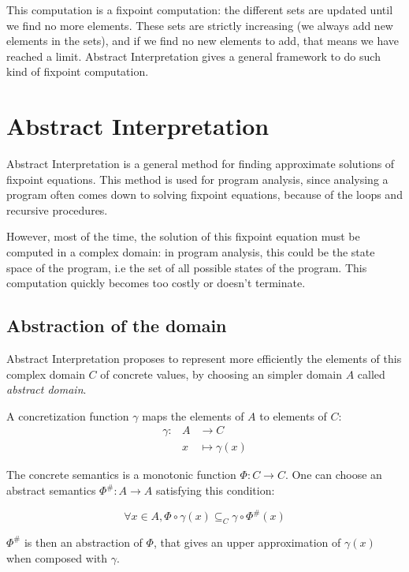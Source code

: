 \documentclass[a4paper,english,titlepage,11pt]{report}
\begin{document}
This computation is a fixpoint computation: the different sets are updated until
we find no more elements. These sets are strictly increasing (we always add new
elements in the sets), and if we find no new elements to add, that means we have
reached a limit. Abstract Interpretation gives a general framework to do such
kind of fixpoint computation.


\section{Abstract Interpretation}

Abstract Interpretation \cite{CC77,CousotCousot92-1} is a general method for
finding approximate solutions of
fixpoint equations. This method is used for program analysis, since analysing a
program often comes down to solving fixpoint equations, because of the loops and
recursive procedures.

However, most of the time, the solution of this fixpoint equation must be
computed in a complex domain: in program analysis, this could be the state space
of the program, i.e the set of all possible states of the program. This
computation quickly becomes too costly or doesn't terminate.

\subsection{Abstraction of the domain}

Abstract Interpretation proposes to represent more efficiently the
elements of this complex domain $C$ of concrete values,
by choosing an simpler domain  $A$ called \emph{abstract domain}. 

A concretization function $\gamma$ maps the elements of $A$ to elements of $C$:
\begin{eqnarray*}
\gamma: & A &\longrightarrow C \\
		& x &\longmapsto \gamma(x)
\end{eqnarray*}

The concrete semantics is a monotonic function $\Phi: C \rightarrow C$.
One can choose an abstract semantics $\Phi^\#: A \rightarrow A$ satisfying this
condition:

$$\forall x \in A, \Phi \circ \gamma (x) \subseteq_C \gamma \circ \Phi^\#(x)$$

$\Phi^\#$ is then an abstraction of $\Phi$, that gives an upper
approximation of $\gamma(x)$ when composed with $\gamma$. 
\end{document}
